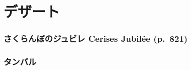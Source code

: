 \hypertarget{ux30c7ux30b6ux30fcux30c8}{%
\section{デザート}\label{ux30c7ux30b6ux30fcux30c8}}

\hypertarget{ux3055ux304fux3089ux3093ux307cux306eux30b8ux30e5ux30d3ux30ec-cerises-jubiluxe9e-p.821}{%
\subsubsection{さくらんぼのジュビレ Cerises Jubilée
(p.~821)}\label{ux3055ux304fux3089ux3093ux307cux306eux30b8ux30e5ux30d3ux30ec-cerises-jubiluxe9e-p.821}}

\hypertarget{ux30bfux30f3ux30d0ux30eb}{%
\subsubsection{タンバル}\label{ux30bfux30f3ux30d0ux30eb}}
